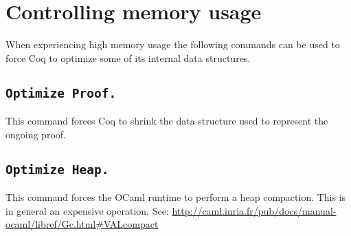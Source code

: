 \section{Controlling memory usage}

When experiencing high memory usage the following commands can be
used to force Coq to optimize some of its internal data structures.

\subsection[\tt Optimize Proof.]{\tt Optimize Proof.}

This command forces Coq to shrink the data structure used to represent
the ongoing proof.

\subsection[\tt Optimize Heap.]{\tt Optimize Heap.}

This command forces the OCaml runtime to perform a heap compaction.
This is in general an expensive operation.  See:
  \url{http://caml.inria.fr/pub/docs/manual-ocaml/libref/Gc.html#VALcompact}


